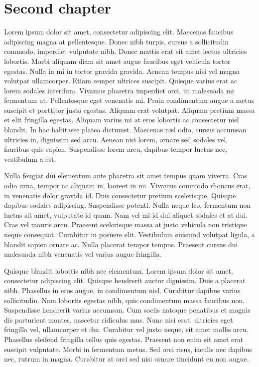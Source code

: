 \chapter{Second chapter}\label{ch:second}
Lorem ipsum dolor sit amet, consectetur adipiscing elit. Maecenas faucibus adipiscing magna at pellentesque. Donec nibh turpis, cursus a sollicitudin commodo, imperdiet vulputate nibh. Donec mattis erat sit amet lectus ultricies lobortis. Morbi aliquam diam sit amet augue faucibus eget vehicula tortor egestas. Nulla in mi in tortor gravida gravida. Aenean tempus nisi vel magna volutpat ullamcorper. Etiam semper ultrices suscipit. Quisque varius erat ac lorem sodales interdum. Vivamus pharetra imperdiet orci, ut malesuada mi fermentum ut. Pellentesque eget venenatis mi. Proin condimentum augue a metus suscipit et porttitor justo egestas. Aliquam erat volutpat. Aliquam pretium massa et elit fringilla egestas. Aliquam varius mi at eros lobortis ac consectetur nisl blandit. In hac habitasse platea dictumst. Maecenas nisl odio, cursus accumsan ultricies in, dignissim sed arcu. Aenean nisi lorem, ornare sed sodales vel, faucibus quis sapien. Suspendisse lorem arcu, dapibus tempor luctus nec, vestibulum a est.

Nulla feugiat dui elementum ante pharetra sit amet tempus quam viverra. Cras odio urna, tempor ac aliquam in, laoreet in mi. Vivamus commodo rhoncus erat, in venenatis dolor gravida id. Duis consectetur pretium scelerisque. Quisque dapibus sodales adipiscing. Suspendisse potenti. Nulla neque leo, fermentum non luctus sit amet, vulputate id quam. Nam vel mi id dui aliquet sodales et at dui. Cras vel mauris arcu. Praesent scelerisque massa at justo vehicula non tristique neque consequat. Curabitur in posuere elit. Vestibulum euismod volutpat ligula, a blandit sapien ornare ac. Nulla placerat tempor tempus. Praesent cursus dui malesuada nibh venenatis vel varius augue fringilla.

Quisque blandit lobortis nibh nec elementum. Lorem ipsum dolor sit amet, consectetur adipiscing elit. Quisque hendrerit auctor dignissim. Duis a placerat nibh. Phasellus in eros augue, in condimentum nisl. Curabitur dapibus varius sollicitudin. Nam lobortis egestas nibh, quis condimentum massa faucibus non. Suspendisse hendrerit varius accumsan. Cum sociis natoque penatibus et magnis dis parturient montes, nascetur ridiculus mus. Nunc nisi erat, ultricies eget fringilla vel, ullamcorper et dui. Curabitur vel justo neque, sit amet mollis arcu. Phasellus eleifend fringilla tellus quis egestas. Praesent non enim sit amet erat suscipit vulputate. Morbi in fermentum metus. Sed orci risus, iaculis nec dapibus nec, rutrum in magna. Curabitur at orci sed nisi ornare tincidunt eu non augue.

